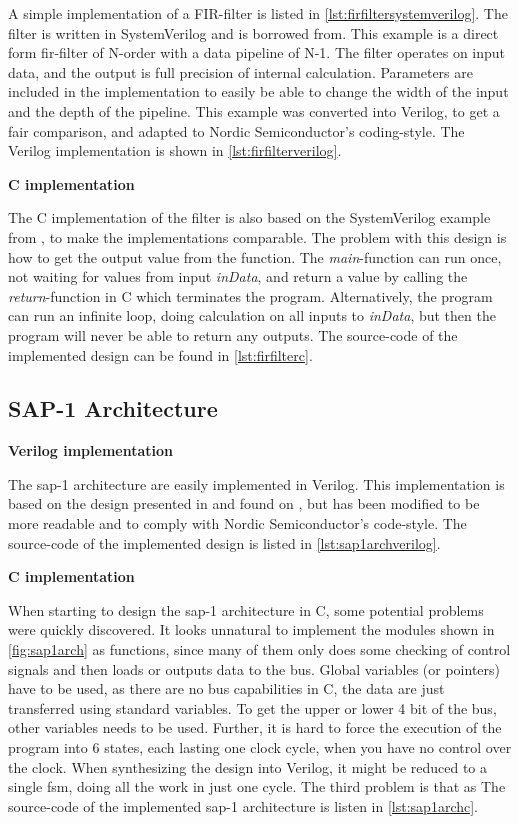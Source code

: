 A simple implementation of a FIR-filter is listed in \cref{lst:firfiltersystemverilog}. The filter is written in SystemVerilog and is borrowed from\cite{mehler2014digital}. This example is a direct form \gls{fir}-filter of N-order with a data pipeline of N-1. The filter operates on input data, and the output is full precision of internal calculation. Parameters are included in the implementation to easily be able to change the width of the input and the depth of the pipeline. This example was converted into Verilog, to get a fair comparison, and adapted to Nordic Semiconductor's coding-style. The Verilog implementation is shown in \cref{lst:firfilterverilog}.

\textbf{C implementation}

The C implementation of the filter is also based on the SystemVerilog example from \cite{mehler2014digital}, to make the implementations comparable. The problem with this design is how to get the output value from the function. The \textit{main}-function can run once, not waiting for values from input \textit{inData}, and return a value by calling the \textit{return}-function in C which terminates the program. Alternatively, the program can run an infinite loop, doing calculation on all inputs to \textit{inData}, but then the program will never be able to return any outputs. The source-code of the implemented design can be found in \cref{lst:firfilterc}.

\subsection{SAP-1 Architecture}
\textbf{Verilog implementation}

The \gls{sap-1} architecture are easily implemented in Verilog. This implementation is based on the design presented in \cite{dutta2007sap1} and found on \cite{sapblog}, but has been modified to be more readable and to comply with Nordic Semiconductor's code-style. The source-code of the implemented design is listed in \cref{lst:sap1archverilog}.

\textbf{C implementation}

When starting to design the \gls{sap-1} architecture in C, some potential problems were quickly discovered. It looks unnatural to implement the modules shown in \cref{fig:sap1arch} as functions, since many of them only does some checking of control signals and then loads or outputs data to the bus. Global variables (or pointers) have to be used, as there are no bus capabilities in C, the data are just transferred using standard variables. To get the upper or lower 4 bit of the bus, other variables needs to be used. Further, it is hard to force the execution of the program into 6 states, each lasting one clock cycle, when you have no control over the clock. When synthesizing the design into Verilog, it might be reduced to a single \gls{fsm}, doing all the work in just one cycle. The third problem is that as  The source-code of the implemented \gls{sap-1} architecture is listen in \cref{lst:sap1archc}.